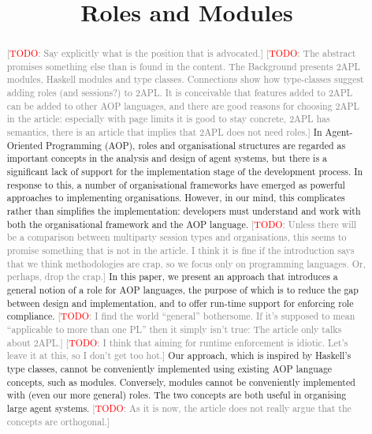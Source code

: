 \documentclass[conference,compsoc]{IEEEtran} %
\title{Roles and Modules}
\author{
  \IEEEauthorblockN{Rem Collier and Claudia Grigore} 
  \IEEEauthorblockA{
    School of Computer Science and Informatics\\
    University College Dublin\\
    Belfield Campus, Dublin~4, Ireland\\
    Email: rem.collier@ucd.ie, claudia.grigore@ucdconnect.ie}}
\newcommand{\todo}[1]{{\small \textcolor{gray}{[\textcolor{red}{TODO}: #1]}}}
\begin{document}
\maketitle
\begin{abstract} %

\todo{Say explicitly what is the position that is advocated.}
\todo{The abstract promises something else than is found in the content.
The Background presents 2APL modules, Haskell modules and type classes.
Connections show how type-classes suggest adding roles (and sessions?) to
2APL. It is conceivable that features added to 2APL can be added to other
AOP languages, and there are good reasons for choosing 2APL in the article:
especially with page limits it is good to stay concrete, 2APL has
semantics, there is an article that implies that 2APL does not need roles.}
In Agent-Oriented Programming (AOP), roles and organisational structures
are regarded as important concepts in the analysis and design of agent
systems, but there is a significant lack of support for the implementation
stage of the development process. In response to this, a number of
organisational frameworks have emerged as powerful approaches to
implementing organisations. However, in our mind, this complicates rather
than simplifies the implementation: developers must understand and work
with both the organisational framework and the AOP language.
\todo{Unless there will be a comparison between multiparty session types
and organisations, this seems to promise something that is not in the
article. I think it is fine if the introduction says that we think
methodologies are crap, so we focus only on programming languages. Or,
perhaps, drop the crap.}
 In this paper,
we present an approach that introduces a general notion of a role for AOP
languages, the purpose of which is to reduce the gap between design and
implementation, and to offer run-time support for enforcing role
compliance. 
\todo{I find the world ``general'' bothersome. If it's supposed to mean
``applicable to more than one PL'' then it simply isn't true: The article
only talks about 2APL.} \todo{I think that aiming for runtime enforcement
is idiotic. Let's leave it at this, so I don't get too hot.}
Our approach, which is inspired by Haskell's type classes,
cannot be conveniently implemented using existing AOP language concepts,
such as modules. Conversely, modules cannot be conveniently implemented
with (even our more general) roles. The two concepts are both useful in
organising large agent systems.
\todo{As it is now, the article does not really argue that the concepts are
orthogonal.}

\end{abstract} %
\end{document}
